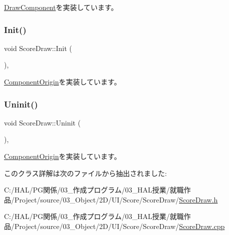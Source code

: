 \mbox{\hyperlink{class_draw_component_ae84bfb6ccc2fda9e54cdff45057ea2c3}{Draw\+Component}}を実装しています。

\mbox{\label{class_score_draw_af013abb96136825e71d4fee06529fc69}} 
\subsubsection{\texorpdfstring{Init()}{Init()}}
{\footnotesize\ttfamily void Score\+Draw\+::\+Init (\begin{DoxyParamCaption}{ }\end{DoxyParamCaption})\hspace{0.3cm}{\ttfamily [override]}, {\ttfamily [virtual]}}



\mbox{\hyperlink{class_component_origin_a9f674891257f2272b1636d8b6bb05d81}{Component\+Origin}}を実装しています。

\mbox{\label{class_score_draw_aad744f8a7a1202e6ba8117c660f297ee}} 
\subsubsection{\texorpdfstring{Uninit()}{Uninit()}}
{\footnotesize\ttfamily void Score\+Draw\+::\+Uninit (\begin{DoxyParamCaption}{ }\end{DoxyParamCaption})\hspace{0.3cm}{\ttfamily [override]}, {\ttfamily [virtual]}}



\mbox{\hyperlink{class_component_origin_a9f89a93f9c1954bd53f9750e35e6089d}{Component\+Origin}}を実装しています。



このクラス詳解は次のファイルから抽出されました\+:\begin{DoxyCompactItemize}
\item 
C\+:/\+H\+A\+L/\+P\+G関係/03\+\_\+作成プログラム/03\+\_\+\+H\+A\+L授業/就職作品/\+Project/source/03\+\_\+\+Object/2\+D/\+U\+I/\+Score/\+Score\+Draw/\mbox{\hyperlink{_score_draw_8h}{Score\+Draw.\+h}}\item 
C\+:/\+H\+A\+L/\+P\+G関係/03\+\_\+作成プログラム/03\+\_\+\+H\+A\+L授業/就職作品/\+Project/source/03\+\_\+\+Object/2\+D/\+U\+I/\+Score/\+Score\+Draw/\mbox{\hyperlink{_score_draw_8cpp}{Score\+Draw.\+cpp}}\end{DoxyCompactItemize}
